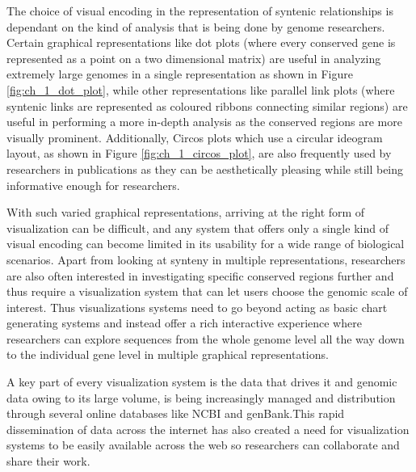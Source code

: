 The choice of visual encoding in the representation of syntenic relationships is dependant on the kind of analysis that is being done by genome researchers. Certain graphical representations like dot plots (where every conserved gene is represented as a point on a two dimensional matrix) are useful in analyzing extremely large genomes in a single representation as shown in Figure \ref{fig:ch_1_dot_plot}, while other representations like parallel link plots (where syntenic links are represented as coloured ribbons connecting similar regions) are useful in performing a more in-depth analysis as the conserved regions are more visually prominent. Additionally, Circos plots which use a circular ideogram layout, as shown in Figure \ref{fig:ch_1_circos_plot}, are also frequently used by researchers in publications as they can be aesthetically pleasing while still being informative enough for researchers.

With such varied graphical representations, arriving at the right form of visualization can be difficult, and any system that offers only a single kind of visual encoding can become limited in its usability for a wide range of biological scenarios. Apart from looking at synteny in multiple representations, researchers are also often interested in  investigating specific conserved regions further and thus require a visualization system that can let users choose the genomic scale of interest. Thus visualizations systems need to go beyond acting as basic chart generating systems and instead offer a rich interactive experience where researchers can explore sequences from the whole genome level all the way down to the individual gene level in multiple graphical representations.

A key part of every visualization system is the data that drives it and genomic data owing to its large volume, is being increasingly managed and distribution through several online databases like NCBI and genBank.This rapid dissemination of data across the internet has also created a need for visualization systems to be easily available across the web so researchers can collaborate and share their work.


